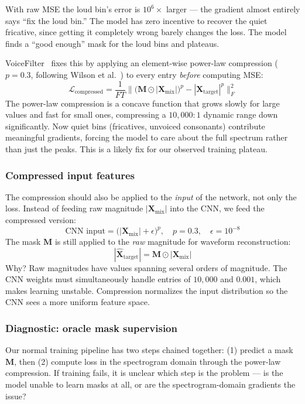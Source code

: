 \documentclass{article}
\begin{document}
With raw MSE the loud bin's error is $10^6\times$ larger --- the gradient almost entirely says ``fix the loud bin.'' The model has zero incentive to recover the quiet fricative, since getting it completely wrong barely changes the loss. The model finds a ``good enough'' mask for the loud bins and plateaus.

VoiceFilter~\cite{VoiceFilter} fixes this by applying an element-wise power-law compression ($p = 0.3$, following Wilson et al.~\cite{Wilson2018}) to every entry \emph{before} computing MSE:
\[
    \mathcal{L}_{\text{compressed}} = \frac{1}{FT} \bigl\| \bigl(\mathbf{M} \odot |\mathbf{X}_{\text{mix}}|\bigr)^{p} - |\mathbf{X}_{\text{target}}|^{p} \bigr\|_F^2
\]
The power-law compression is a concave function that grows slowly for large values and fast for small ones, compressing a $10{,}000\!:\!1$ dynamic range down significantly. Now quiet bins (fricatives, unvoiced consonants) contribute meaningful gradients, forcing the model to care about the full spectrum rather than just the peaks. This is a likely fix for our observed training plateau.

\subsubsection{Compressed input features}

The compression should also be applied to the \emph{input} of the network, not only the loss. Instead of feeding raw magnitude $|\mathbf{X}_{\text{mix}}|$ into the CNN, we feed the compressed version:
\[
    \text{CNN input} = \bigl(|\mathbf{X}_{\text{mix}}| + \epsilon\bigr)^{p}, \quad p = 0.3, \quad \epsilon = 10^{-8}
\]
The mask $\mathbf{M}$ is still applied to the \emph{raw} magnitude for waveform reconstruction:
\[
    |\hat{\mathbf{X}}_{\text{target}}| = \mathbf{M} \odot |\mathbf{X}_{\text{mix}}|
\]
Why? Raw magnitudes have values spanning several orders of magnitude. The CNN weights must simultaneously handle entries of $10{,}000$ and $0.001$, which makes learning unstable. Compression normalizes the input distribution so the CNN sees a more uniform feature space.

\subsubsection{Diagnostic: oracle mask supervision}

Our normal training pipeline has two steps chained together: (1) predict a mask $\mathbf{M}$, then (2) compute loss in the spectrogram domain through the power-law compression. If training fails, it is unclear which step is the problem --- is the model unable to learn masks at all, or are the spectrogram-domain gradients the issue?
\end{document}

